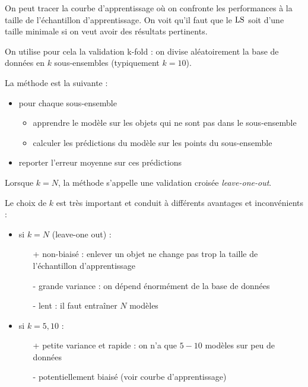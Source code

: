 	On peut tracer la courbe d'apprentissage où on confronte les performances à la taille de l'échantillon d'apprentissage. On voit qu'il faut que le $\text{LS}$ soit d'une taille minimale si on veut avoir des résultats pertinents.
	
	
	On utilise pour cela la validation k-fold : on divise aléatoirement la base de données en $k$ sous-ensembles (typiquement $k = 10$).
	
	
	La méthode est la suivante :
	
	\begin{itemize}
		\item pour chaque sous-ensemble
		\begin{itemize}
			\item apprendre le modèle sur les objets qui ne sont pas dans le sous-ensemble
			\item calculer les prédictions du modèle sur les points du sous-ensemble
		\end{itemize}
		\item reporter l'erreur moyenne sur ces prédictions
	\end{itemize}
	
	Lorsque $k = N$, la méthode s'appelle une validation croisée \textit{leave-one-out}.
	
	Le choix de $k$ est très important et conduit à différents avantages et inconvénients :
	
	\begin{itemize}
		\item si $k = N$ (leave-one out) :
		\begin{itemize}
			\item[+] non-biaisé : enlever un objet ne change pas trop la taille de l'échantillon d'apprentissage
			\item[-] grande variance : on dépend énormément de la base de données
			\item[-] lent : il faut entraîner $N$ modèles
		\end{itemize}
		\item si $k = 5, 10$ :
		
		\begin{itemize}
			\item[+] petite variance et rapide : on n'a que $5-10$ modèles sur peu de données
			\item[-] potentiellement biaisé (voir courbe d'apprentissage)
		\end{itemize}
	\end{itemize}
	
